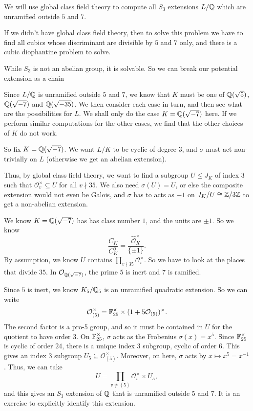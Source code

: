 \documentclass[a4paper]{article}
\begin{document}
\begin{eg}
  We will use global class field theory to compute all $S_3$ extensions $L/\mathbb{Q}$ which are unramified outside $5$ and $7$.

  If we didn't have global class field theory, then to solve this problem we have to find all cubics whose discriminant are divisible by $5$ and $7$ only, and there is a cubic diophantine problem to solve.

  While $S_3$ is not an abelian group, it is solvable. So we can break our potential extension as a chain
  \begin{center}
  \end{center}
  Since $L/\mathbb{Q}$ is unramified outside $5$ and $7$, we know that $K$ must be one of $\mathbb{Q}(\sqrt{5})$, $\mathbb{Q}(\sqrt{-7})$ and $\mathbb{Q}(\sqrt{-35})$. We then consider each case in turn, and then see what are the possibilities for $L$. We shall only do the case $K = \mathbb{Q}(\sqrt{-7})$ here. If we perform similar computations for the other cases, we find that the other choices of $K$ do not work.

  So fix $K = \mathbb{Q}(\sqrt{-7})$. We want $L/K$ to be cyclic of degree $3$, and $\sigma$ must act non-trivially on $L$ (otherwise we get an abelian extension).

  Thus, by global class field theory, we want to find a subgroup $U \leq J_K$ of index $3$ such that $\mathcal{O}_v^\times \subseteq U$ for all $v \nmid 35$. We also need $\sigma(U) = U$, or else the composite extension would not even be Galois, and $\sigma$ has to acts as $-1$ on $J_K/U \cong \mathbb{Z}/3\mathbb{Z}$ to get a non-abelian extension.

  We know $K = \mathbb{Q}(\sqrt{-7})$ has has class number $1$, and the units are $\pm 1$. So we know
  \[
    \frac{C_K}{C_K^0} = \frac{\hat{\mathcal{O}}_K^\times}{\{\pm 1\}}.
  \]
  By assumption, we know $U$ contains $\prod_{v \nmid 35} \mathcal{O}_v^\times$. So we have to look at the places that divide $35$. In $\mathcal{O}_{\mathbb{Q}(\sqrt{-7})}$, the prime $5$ is inert and $7$ is ramified.

  Since $5$ is inert, we know $K_5/\mathbb{Q}_5$ is an unramified quadratic extension. So we can write
  \[
    \mathcal{O}_{(5)}^\times = \mathbb{F}_{25}^\times \times (1 + 5\mathcal{O}_{(5)})^\times.
  \]
  The second factor is a pro-5 group, and so it must be contained in $U$ for the quotient to have order $3$. On $\mathbb{F}_{25}^\times$, $\sigma$ acts as the Frobenius $\sigma(x) = x^5$. Since $\mathbb{F}_{25}^\times$ is cyclic of order $24$, there is a unique index $3$ subgroup, cyclic of order $6$. This gives an index $3$ subgroup $U_5 \subseteq \mathcal{O}_{(5)}^\times$. Moreover, on here, $\sigma$ acts by $x \mapsto x^5 = x^{-1}$. Thus, we can take
  \[
    U = \prod_{v \not= (5)} \mathcal{O}_v^\times \times U_5,
  \]
  and this gives an $S_3$ extension of $\mathbb{Q}$ that is unramified outside $5$ and $7$. It is an exercise to explicitly identify this extension. %


\end{eg}
\end{document}
